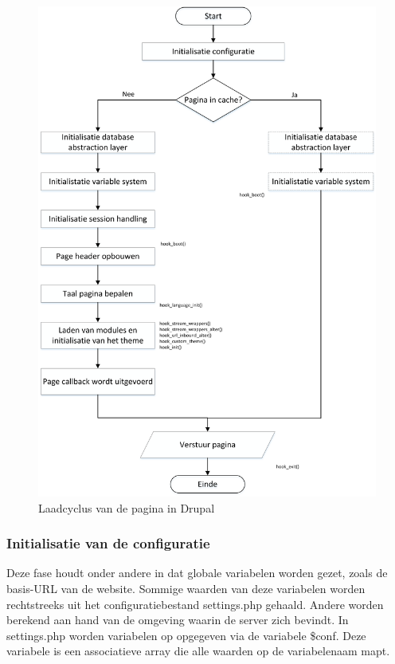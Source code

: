 \begin{figure}
\centering
\includegraphics[width=1\textwidth]{fig/drupalPageRendering}
\caption{Laadcyclus van de pagina in Drupal}
\label{fig:drupalPageRendering}
\end{figure}

\subsubsection{Initialisatie van de configuratie}
Deze fase houdt onder andere in dat globale variabelen worden gezet, zoals de basis-URL van de website. Sommige waarden van deze variabelen worden rechtstreeks uit het configuratiebestand settings.php gehaald. Andere worden berekend aan hand van de omgeving waarin de server zich bevindt. In settings.php worden variabelen op opgegeven via de variabele \$conf. Deze variabele is een associatieve array die alle waarden op de variabelenaam mapt.

